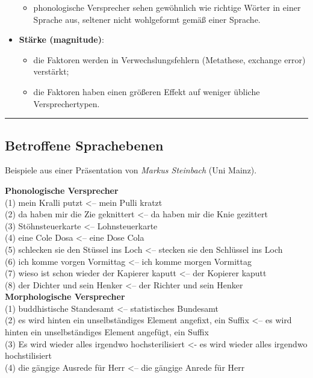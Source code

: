 \documentclass[
  letterpaper,
]{scrbook}
\providecommand{\tightlist}{%
  \setlength{\itemsep}{0pt}\setlength{\parskip}{0pt}}\usepackage{longtable,booktabs,array}
\begin{document}
\begin{itemize}
  \begin{itemize}
  \tightlist
  \item
    phonologische Versprecher sehen gewöhnlich wie richtige Wörter in
    einer Sprache aus, seltener nicht wohlgeformt gemäß einer Sprache.
  \end{itemize}
\item
  \textbf{Stärke (magnitude)}:

  \begin{itemize}
  \tightlist
  \item
    die Faktoren werden in Verwechslungsfehlern (Metathese, exchange
    error) verstärkt;
  \item
    die Faktoren haben einen größeren Effekt auf weniger übliche
    Versprechertypen.
  \end{itemize}
\end{itemize}

\begin{center}\rule{0.5\linewidth}{0.5pt}\end{center}

\hypertarget{betroffene-sprachebenen}{%
\subsection{Betroffene Sprachebenen}\label{betroffene-sprachebenen}}

Beispiele aus einer Präsentation von \emph{Markus Steinbach} (Uni
Mainz).

\textbf{Phonologische Versprecher}\\
(1) mein Kralli putzt \textless-- mein Pulli kratzt\\
(2) da haben mir die Zie geknittert \textless-- da haben mir die Knie
gezittert\\
(3) Stöhnsteuerkarte \textless-- Lohnsteuerkarte\\
(4) eine Cole Dosa \textless-- eine Dose Cola\\
(5) schlecken sie den Stüssel ins Loch \textless-- stecken sie den
Schlüssel ins Loch\\
(6) ich komme vorgen Vormittag \textless-- ich komme morgen Vormittag\\
(7) wieso ist schon wieder der Kapierer kaputt \textless-- der Kopierer
kaputt\\
(8) der Dichter und sein Henker \textless-- der Richter und sein
Henker\\

\textbf{Morphologische Versprecher}\\
(1) buddhistische Standesamt \textless-- statistisches Bundesamt\\
(2) es wird hinten ein unselbständiges Element angefixt, ein Suffix
\textless-- es wird hinten ein unselbständiges Element angefügt, ein
Suffix\\
(3) Es wird wieder alles irgendwo hochsterilisiert \textless- es wird
wieder alles irgendwo hochstilisiert\\
(4) die gängige Ausrede für Herr \textless-- die gängige Anrede für
Herr\\
\end{document}
